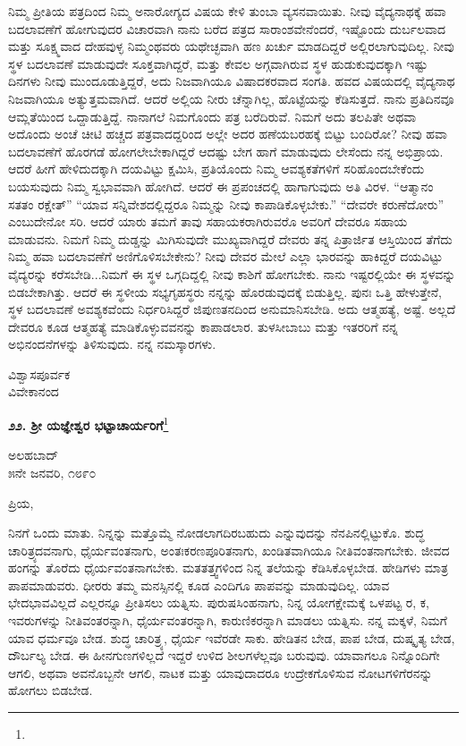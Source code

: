 ನಿಮ್ಮ ಪ್ರೀತಿಯ ಪತ್ರದಿಂದ ನಿಮ್ಮ ಅನಾರೋಗ್ಯದ ವಿಷಯ ಕೇಳಿ ತುಂಬಾ ವ್ಯಸನ\break ವಾಯಿತು. ನೀವು ವೈದ್ಯನಾಥಕ್ಕೆ ಹವಾ ಬದಲಾವಣೆಗೆ ಹೋಗುವುದರ ವಿಚಾರವಾಗಿ ನಾನು ಬರೆದ ಪತ್ರದ ಸಾರಾಂಶವೇನೆಂದರೆ, ಇಷ್ಟೊಂದು ದುರ್ಬಲವಾದ ಮತ್ತು ಸೂಕ್ಷ್ಮವಾದ ದೇಹವುಳ್ಳ ನಿಮ್ಮಂಥವರು ಯಥೇಚ್ಛವಾಗಿ ಹಣ ಖರ್ಚು ಮಾಡದಿದ್ದರೆ ಅಲ್ಲಿರಲಾಗುವುದಿಲ್ಲ. ನೀವು ಸ್ಥಳ ಬದಲಾವಣೆ ಮಾಡುವುದೇ ಸೂಕ್ತವಾಗಿದ್ದರೆ, ಮತ್ತು ಕೇವಲ ಅಗ್ಗವಾಗಿರುವ ಸ್ಥಳ ಹುಡುಕುವುದಕ್ಕಾಗಿ ಇಷ್ಟು ದಿನಗಳು ನೀವು ಮುಂದೂಡುತ್ತಿದ್ದರೆ, ಅದು ನಿಜವಾಗಿಯೂ ವಿಷಾದಕರವಾದ ಸಂಗತಿ. ಹವದ ವಿಷಯದಲ್ಲಿ ವೈದ್ಯನಾಥ ನಿಜವಾಗಿಯೂ ಅತ್ಯುತ್ತಮವಾಗಿದೆ. ಆದರೆ ಅಲ್ಲಿಯ ನೀರು ಚೆನ್ನಾಗಿಲ್ಲ, ಹೊಟ್ಟೆಯನ್ನು ಕೆಡಿಸುತ್ತದೆ. ನಾನು ಪ್ರತಿದಿನವೂ ಆಮ್ಲತೆಯಿಂದ  ಒದ್ದಾಡುತ್ತಿದ್ದೆ. ನಾನಾಗಲೆ ನಿಮಗೊಂದು ಪತ್ರ ಬರೆದಿರುವೆ. ನಿಮಗೆ ಅದು ತಲಪಿತೇ ಅಥವಾ ಅದೊಂದು ಅಂಚೆ ಚೀಟಿ ಹಚ್ಚದ ಪತ್ರವಾದದ್ದರಿಂದ ಅಲ್ಲೇ ಅದರ ಹಣೆಯಬರಹಕ್ಕೆ ಬಿಟ್ಟು ಬಂದಿರೋ? ನೀವು ಹವಾ ಬದಲಾವಣೆಗೆ ಹೊರಗಡೆ ಹೋಗಲೇಬೇಕಾಗಿದ್ದರೆ ಆದಷ್ಟು ಬೇಗ ಹಾಗೆ ಮಾಡುವುದು ಲೇಸೆಂದು ನನ್ನ ಅಭಿಪ್ರಾಯ. ಆದರೆ ಹೀಗೆ ಹೇಳಿದುದಕ್ಕಾಗಿ ದಯವಿಟ್ಟು ಕ್ಷಮಿಸಿ, ಪ್ರತಿಯೊಂದು ನಿಮ್ಮ ಆವಶ್ಯಕತೆಗಳಿಗೆ ಸರಿಹೊಂದಬೇಕೆಂದು ಬಯಸುವುದು ನಿಮ್ಮ ಸ್ವಭಾವವಾಗಿ ಹೋಗಿದೆ. ಆದರೆ ಈ ಪ್ರಪಂಚದಲ್ಲಿ ಹಾಗಾಗುವುದು ಅತಿ ವಿರಳ. “ಆತ್ಮಾನಂ ಸತತಂ ರಕ್ಷೇತ್” “ಯಾವ ಸನ್ನಿವೇಶದಲ್ಲಿದ್ದರೂ ನಿಮ್ಮನ್ನು ನೀವು ಕಾಪಾಡಿಕೊಳ್ಳಬೇಕು.” “ದೇವರೇ ಕರುಣೆದೋರು” ಎಂಬುದೇನೋ ಸರಿ. ಆದರೆ ಯಾರು ತಮಗೆ ತಾವು ಸಹಾಯಕರಾಗಿರುವರೊ ಅವರಿಗೆ ದೇವರೂ ಸಹಾಯ ಮಾಡುವನು. ನಿಮಗೆ ನಿಮ್ಮ ದುಡ್ಡನ್ನು ಮಿಗಿಸುವುದೇ ಮುಖ್ಯವಾಗಿದ್ದರೆ ದೇವರು ತನ್ನ ಪಿತ್ರಾರ್ಜಿತ ಆಸ್ತಿಯಿಂದ ತೆಗೆದು ನಿಮ್ಮ ಹವಾ ಬದಲಾವಣೆಗೆ ಅಣಿಗೊಳಿಸಬೇಕೇನು? ನೀವು ದೇವರ ಮೇಲೆ ಎಲ್ಲಾ ಭಾರವನ್ನು ಹಾಕಿದ್ದರೆ ದಯವಿಟ್ಟು ವೈದ್ಯರನ್ನು ಕರೆಸಬೇಡಿ...ನಿಮಗೆ ಈ ಸ್ಥಳ ಒಗ್ಗದಿದ್ದಲ್ಲಿ ನೀವು ಕಾಶಿಗೆ ಹೋಗಬೇಕು. ನಾನು ಇಷ್ಟರಲ್ಲಿಯೇ ಈ ಸ್ಥಳವನ್ನು ಬಿಡಬೇಕಾಗಿತ್ತು. ಆದರೆ ಈ ಸ್ಥಳೀಯ ಸಭ್ಯಗೃಹಸ್ಥರು ನನ್ನನ್ನು ಹೊರಡುವುದಕ್ಕೆ ಬಿಡುತ್ತಿಲ್ಲ. ಪುನಃ ಒತ್ತಿ ಹೇಳುತ್ತೇನೆ, ಸ್ಥಳ ಬದಲಾವಣೆ ಅವಶ್ಯಕವೆಂದು ನಿರ್ಧರಿಸಿದ್ದರೆ ಜಿಪುಣತನದಿಂದ ಅನುಮಾನಿಸಬೇಡಿ. ಅದು ಆತ್ಮಹತ್ಯೆ, ಅಷ್ಟೆ. ಅಲ್ಲದೆ ದೇವರೂ ಕೂಡ ಆತ್ಮಹತ್ಯೆ ಮಾಡಿಕೊಳ್ಳುವವನನ್ನು ಕಾಪಾಡಲಾರ. ತುಳಸೀಬಾಬು ಮತ್ತು ಇತರರಿಗೆ ನನ್ನ ಅಭಿನಂದನೆಗಳನ್ನು ತಿಳಿಸುವುದು. ನನ್ನ ನಮಸ್ಕಾರಗಳು.

{\flushright
ವಿಶ್ವಾಸಪೂರ್ವಕ\\ವಿವೇಕಾನಂದ\par}

\newpage

\begin{center}
\textbf{೨೨. ಶ‍್ರೀ ಯಜ್ಞೇಶ್ವರ ಭಟ್ಟಾಚಾರ್ಯರಿಗೆ}\footnote{}
\end{center}

\begin{flushright}
ಅಲಹಬಾದ್\\೫ನೇ ಜನವರಿ, ೧೮೯೦
\end{flushright}

\noindent
ಪ್ರಿಯ,

ನಿನಗೆ ಒಂದು ಮಾತು. ನಿನ್ನನ್ನು ಮತ್ತೊಮ್ಮೆ ನೋಡಲಾಗದಿರಬಹುದು ಎನ್ನುವುದನ್ನು ನೆನಪಿನಲ್ಲಿಟ್ಟುಕೊ. ಶುದ್ಧ ಚಾರಿತ್ರ್ಯದವನಾಗು, ಧೈರ್ಯವಂತನಾಗು, ಅಂತಃಕರಣಪೂರಿತನಾಗು, ಖಂಡಿತವಾಗಿಯೂ ನೀತಿವಂತನಾಗಬೇಕು. ಜೀವದ ಹಂಗನ್ನು ತೊರೆದು ಧೈರ್ಯವಂತನಾಗಬೇಕು. ಮತತತ್ತ್ವಗಳಿಂದ ನಿನ್ನ ತಲೆಯನ್ನು ಕೆಡಿಸಿಕೊಳ್ಳಬೇಡ. ಹೇಡಿಗಳು ಮಾತ್ರ ಪಾಪಮಾಡುವರು. ಧೀರರು ತಮ್ಮ ಮನಸ್ಸಿನಲ್ಲಿ ಕೂಡ ಎಂದಿಗೂ ಪಾಪವನ್ನು ಮಾಡುವುದಿಲ್ಲ. ಯಾವ ಭೇದಭಾವವಿಲ್ಲದೆ ಎಲ್ಲರನ್ನೂ ಪ್ರೀತಿಸಲು ಯತ್ನಿಸು. ಪುರುಷಸಿಂಹನಾಗು, ನಿನ್ನ ಯೋಗಕ್ಷೇಮಕ್ಕೆ ಒಳಪಟ್ಟ ರ\enginline{-}, ಕ\enginline{-}, ಇವರುಗಳನ್ನು ನೀತಿವಂತರನ್ನಾಗಿ, ಧೈರ್ಯವಂತರನ್ನಾಗಿ, ಕಾರುಣಿಕರನ್ನಾಗಿ ಮಾಡಲು ಯತ್ನಿಸು. ನನ್ನ ಮಕ್ಕಳೆ, ನಿಮಗೆ ಯಾವ ಧರ್ಮವೂ ಬೇಡ. ಶುದ್ಧ ಚಾರಿತ್ರ್ಯ, ಧೈರ್ಯ ಇವೆರಡೇ ಸಾಕು. ಹೇಡಿತನ ಬೇಡ, ಪಾಪ ಬೇಡ, ದುಷ್ಕೃತ್ಯ ಬೇಡ, ದೌರ್ಬಲ್ಯ ಬೇಡ. ಈ ಹೀನಗುಣಗಳಿಲ್ಲದೆ ಇದ್ದರೆ ಉಳಿದ ಶೀಲಗಳೆಲ್ಲವೂ ಬರುವುವು. ಯಾವಾಗಲೂ ನಿನ್ನೊಂದಿಗೇ ಆಗಲಿ, ಅಥವಾ ಅವನೊಬ್ಬನೇ ಆಗಲಿ, ನಾಟಕ ಮತ್ತು ಯಾವುದಾದರೂ ಉದ್ರೇಕಗೊಳಿಸುವ ನೋಟಗಳಿಗೆ\break ರ\enginline{-}ನನ್ನು ಹೋಗಲು ಬಿಡಬೇಡ.

